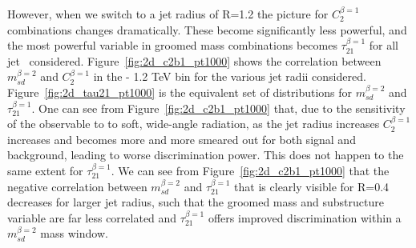 However, when we switch to a jet radius of R=1.2 the picture for
$C_2^{\beta=1}$ combinations changes dramatically. These become
significantly less powerful, and the most powerful variable in groomed
mass combinations becomes $\tau_{21}^{\beta=1}$ for all jet
\pt~considered. Figure~\ref{fig:2d_c2b1_pt1000} shows the correlation between
$m_{sd}^{\beta=2}$ and $C_2^{\beta=1}$ in the  - 1.2 TeV bin for
the various jet radii considered. Figure~\ref{fig:2d_tau21_pt1000} is
the equivalent set of distributions for $m_{sd}^{\beta=2}$ and
$\tau_{21}^{\beta=1}$. One can see from
Figure~\ref{fig:2d_c2b1_pt1000} that, due to the sensitivity of the
observable to to soft, wide-angle radiation, as the jet radius increases
$C_2^{\beta=1}$ increases and becomes more and more smeared out for both signal and
background, leading to worse discrimination power. This does not
happen to the same extent for $\tau_{21}^{\beta=1}$. We can see from Figure~\ref{fig:2d_c2b1_pt1000} that
the negative correlation between $m_{sd}^{\beta=2}$ and
$\tau_{21}^{\beta=1}$ that is clearly visible for R=0.4 decreases for
larger jet radius, such that the groomed mass and substructure variable
are far less correlated and $\tau_{21}^{\beta=1}$ offers improved
discrimination within a $m_{sd}^{\beta=2}$ mass window.



